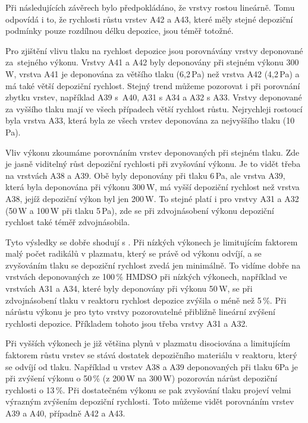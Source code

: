 \documentclass[12pt,oneside,final]{fithesis2}
\begin{document}
Při následujících závěrech bylo předpokládáno, že vrstvy rostou lineárně. Tomu odpovídá i to, že rychlosti růstu vrstev A42 a A43, které měly stejné depoziční podmínky pouze rozdílnou délku depozice, jsou téměř totožné. 

Pro zjištění vlivu tlaku na rychlost depozice jsou porovnávány vrstvy deponované za~stejného výkonu. Vrstvy A41 a A42 byly deponovány při stejném výkonu 300\,W, vrstva A41 je deponována za většího tlaku (6,2\,Pa) než vrstva A42 (4,2\,Pa) a má také větší depoziční rychlost. Stejný trend můžeme pozorovat i při porovnání zbytku vrstev, například A39 s~A40, A31 s A34 a A32 s A33. Vrstvy deponované za vyššího tlaku mají ve všech případech větší rychlost růstu. Nejrychleji rostoucí byla vrstva A33, která byla ze všech vrstev deponována za nejvyššího tlaku (10\,Pa).

Vliv výkonu zkoumáme porovnáním vrstev deponovaných při stejném tlaku. Zde je jasně viditelný růst depoziční rychlosti při zvyšování výkonu. Je to vidět třeba na vrstvách A38 a A39. Obě byly deponovány při tlaku 6\,Pa, ale vrstva A39, která byla deponována při výkonu 300\,W, má vyšší depoziční rychlost než vrstva A38, jejíž depoziční výkon byl jen 200\,W. To stejné platí i pro vrstvy A31 a A32 (50\,W a 100\,W při tlaku 5\,Pa), zde se při zdvojnásobení výkonu depoziční rychlost také téměř zdvojnásobila.

Tyto výsledky se dobře shodují s \cite{yasudaspeed}. Při nízkých výkonech je limitujícím faktorem malý počet radikálů v plazmatu, který se právě od výkonu odvíjí, a se zvyšováním tlaku se depoziční rychlost zvedá jen minimálně. To vidíme dobře na vrstvách deponovaných ze 100\,\% HMDSO při nízkých výkonech, například ve vrstvách A31 a A34, které byly deponovány při výkonu 50\,W, se při zdvojnásobení tlaku v reaktoru rychlost depozice zvýšila o méně než 5\,\%. Při nárůstu výkonu je pro tyto vrstvy pozorovatelné přibližně lineární zvýšení rychlosti depozice. Příkladem tohoto jsou třeba vrstvy A31 a A32.

Při vyšších výkonech je již většina plynů v plazmatu disociována a limitujícím faktorem růstu vrstev se stává dostatek depozičního materiálu v reaktoru, který se odvíjí od tlaku. Například u vrstev A38 a A39 deponovaných při tlaku 6Pa je při zvýšení výkonu o 50\,\% (z 200\,W na 300\,W) pozorován nárůst depoziční rychlosti o 13\,\%. Při dostatečném výkonu se pak zvyšování tlaku projeví velmi výrazným zvýšením depoziční rychlosti. Toto můžeme vidět porovnáním vrstev A39 a A40, případně A42 a A43.
\end{document}
